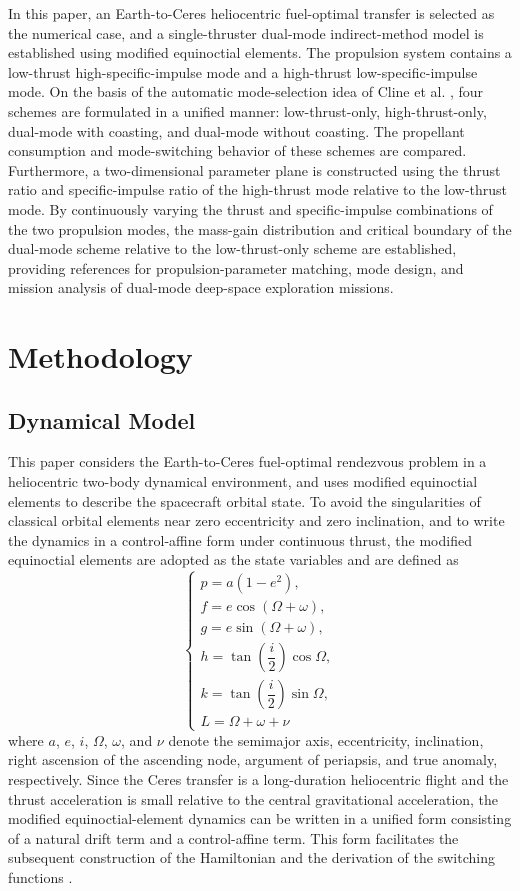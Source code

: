 ﻿\documentclass{IEEEtaes}
\begin{document}
In this paper, an Earth-to-Ceres heliocentric fuel-optimal transfer is selected as the numerical case, and a single-thruster dual-mode indirect-method model is established using modified equinoctial elements. The propulsion system contains a low-thrust high-specific-impulse mode and a high-thrust low-specific-impulse mode. On the basis of the automatic mode-selection idea of Cline et al. \cite{cline2024a}, four schemes are formulated in a unified manner: low-thrust-only, high-thrust-only, dual-mode with coasting, and dual-mode without coasting. The propellant consumption and mode-switching behavior of these schemes are compared. Furthermore, a two-dimensional parameter plane is constructed using the thrust ratio and specific-impulse ratio of the high-thrust mode relative to the low-thrust mode. By continuously varying the thrust and specific-impulse combinations of the two propulsion modes, the mass-gain distribution and critical boundary of the dual-mode scheme relative to the low-thrust-only scheme are established, providing references for propulsion-parameter matching, mode design, and mission analysis of dual-mode deep-space exploration missions.


\section{Methodology}

\subsection{Dynamical Model}
This paper considers the Earth-to-Ceres fuel-optimal rendezvous problem in a heliocentric two-body dynamical environment, and uses modified equinoctial elements to describe the spacecraft orbital state. To avoid the singularities of classical orbital elements near zero eccentricity and zero inclination, and to write the dynamics in a control-affine form under continuous thrust, the modified equinoctial elements are adopted as the state variables and are defined as
\begin{equation}
\begin{cases}
p=a(1-e^2),\\
f=e\cos(\Omega+\omega),\\
g=e\sin(\Omega+\omega),\\
h=\tan\left(\dfrac{i}{2}\right)\cos\Omega,\\
k=\tan\left(\dfrac{i}{2}\right)\sin\Omega,\\
L=\Omega+\omega+\nu 
\end{cases}
\end{equation}
where $a$, $e$, $i$, $\Omega$, $\omega$, and $\nu$ denote the semimajor axis, eccentricity, inclination, right ascension of the ascending node, argument of periapsis, and true anomaly, respectively. Since the Ceres transfer is a long-duration heliocentric flight and the thrust acceleration is small relative to the central gravitational acceleration, the modified equinoctial-element dynamics can be written in a unified form consisting of a natural drift term and a control-affine term. This form facilitates the subsequent construction of the Hamiltonian and the derivation of the switching functions \cite{jiang2012,chi2022}.
\end{document}

